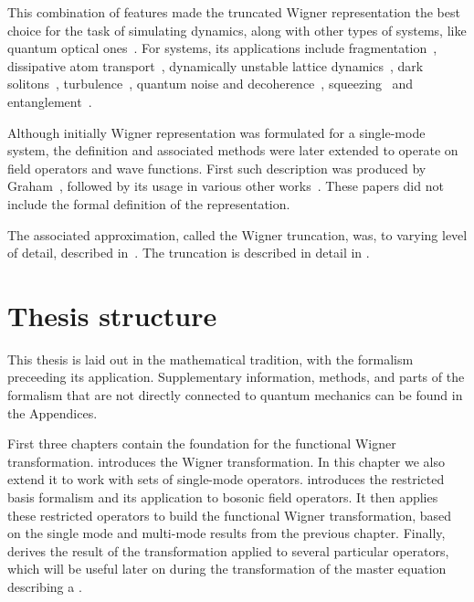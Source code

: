 This combination of features made the truncated Wigner representation the best choice for the task of simulating  dynamics, along with other types of systems, like quantum optical ones~\cite{Drummond1993,Drummond1993a,Corney2008,Corney2006}.
For  systems, its applications include fragmentation~\cite{Isella2006,Isella2005,Gross2011}, dissipative atom transport~\cite{Ruostekoski2005}, dynamically unstable lattice dynamics~\cite{Shrestha2009}, dark solitons~\cite{Martin2010,Martin2010a}, turbulence~\cite{Norrie2005,Norrie2006}, quantum noise and decoherence~\cite{Steel1998,Norrie2006a,Egorov2011}, squeezing~\cite{Opanchuk2012} and entanglement~\cite{Opanchuk2012a}.

Although initially Wigner representation was formulated for a single-mode system, the definition and associated methods were later extended to operate on field operators and wave functions.
First such description was produced by Graham~\cite{Graham1970,Graham1970a}, followed by its usage in various other works~\cite{Steel1998,Gardiner2003,Isella2006,Norrie2006,Norrie2006a,Blakie2008,Martin2010,Polkovnikov2010,Gross2011}.
These papers did not include the formal definition of the representation.

The associated approximation, called the Wigner truncation, was, to varying level of detail, described in~\cite{Drummond1993,Steel1998,Sinatra2002}.
The truncation is described in detail in .


\section{Thesis structure}

This thesis is laid out in the mathematical tradition, with the formalism preceeding its application.
Supplementary information, methods, and parts of the formalism that are not directly connected to quantum mechanics can be found in the Appendices.

First three chapters contain the foundation for the functional Wigner transformation.
 introduces the Wigner transformation.
In this chapter we also extend it to work with sets of single-mode operators.
 introduces the restricted basis formalism and its application to bosonic field operators.
It then applies these restricted operators to build the functional Wigner transformation, based on the single mode and multi-mode results from the previous chapter.
Finally,  derives the result of the transformation applied to several particular operators, which will be useful later on during the transformation of the master equation describing a .


